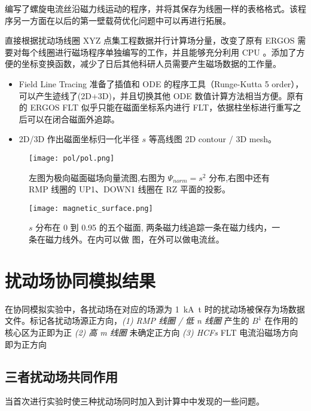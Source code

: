 编写了螺旋电流丝沿磁力线运动的程序，并将其保存为线圈一样的表格格式。该程序另一方面在以后的第一壁载荷优化问题中可以再进行拓展。


直接根据扰动场线圈 XYZ 点集工程数据并行计算场分量，改变了原有 ERGOS 需要对每个线圈进行磁场程序单独编写的工作，并且能够充分利用 CPU 。添加了方便的坐标变换函数，减少了日后其他科研人员需要产生磁场数据的工作量。


\begin{itemize}
  \item Field Line Tracing 准备了插值和 ODE 的程序工具（Runge-Kutta 5 order），可以产生迹线了(2D+3D)，并且切换其他 ODE 数值计算方法相当方便。原有的 ERGOS FLT 似乎只能在磁面坐标系内进行 FLT，依据柱坐标进行重写之后可以在闭合磁面外追踪。
  \item 2D/3D 作出磁面坐标归一化半径 $s$ 等高线图 2D contour / 3D mesh。
\end{itemize}


  



  
    

\begin{figure}[htbp]
    \centering%
        \texttt{[image: pol/pol.png]}
        \caption{左图为极向磁面磁场向量流图,右图为 $\Psi_{norm}=s^2$ 分布,右图中还有 RMP 线圈的 UP1、DOWN1 线圈在 RZ 平面的投影。}
\end{figure}



  \begin{figure}[htbp]
      \centering%
          \texttt{[image: magnetic\_surface.png]}
          \caption{$s$ 分布在 0 到 0.95 的五个磁面, 两条磁力线追踪一条在磁力线内，一条在磁力线外。在内可以做 \Poincare 图，在外可以做电流丝。}
  \end{figure}
  



\section{扰动场协同模拟结果}
在协同模拟实验中，各扰动场在对应的场源为 \SI{1}{\kilo\ampere t} 时的扰动场被保存为场数据文件。标记各扰动场源正方向，\textit{(1) RMP 线圈 / 低 n 线圈} 产生的 $B^1$ 在作用的核心区为正即为正  \textit{(2) 高 m 线圈} 未确定正方向 \textit{(3) HCFs} FLT 电流沿磁场方向即为正方向

\subsection{三者扰动场共同作用}
  当首次进行实验时使三种扰动场同时加入到计算中中发现的一些问题。

